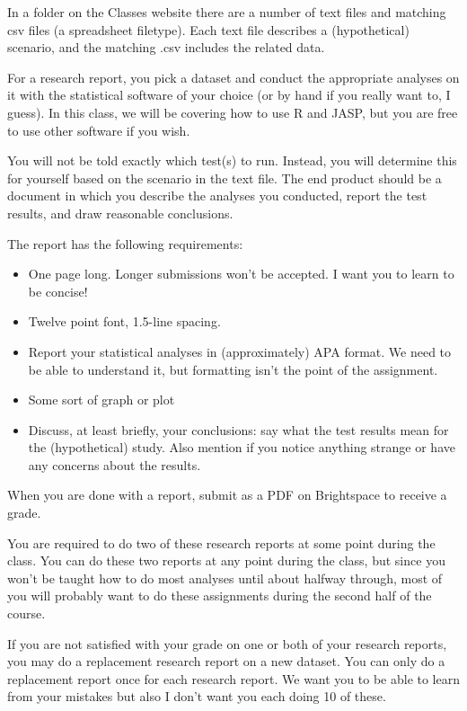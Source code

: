 \documentclass[
]{book}
\providecommand{\tightlist}{%
  \setlength{\itemsep}{0pt}\setlength{\parskip}{0pt}}
\begin{document}
In a folder on the Classes website there are a number of text files and matching csv files (a spreadsheet filetype). Each text file describes a (hypothetical) scenario, and the matching .csv includes the related data.

For a research report, you pick a dataset and conduct the appropriate analyses on it with the statistical software of your choice (or by hand if you really want to, I guess). In this class, we will be covering how to use R and JASP, but you are free to use other software if you wish.

You will not be told exactly which test(s) to run. Instead, you will determine this for yourself based on the scenario in the text file. The end product should be a document in which you describe the analyses you conducted, report the test results, and draw reasonable conclusions.

The report has the following requirements:

\begin{itemize}
\tightlist
\item
  One page long. Longer submissions won't be accepted. I want you to learn to be concise!
\item
  Twelve point font, 1.5-line spacing.
\item
  Report your statistical analyses in (approximately) APA format. We need to be able to understand it, but formatting isn't the point of the assignment.
\item
  Some sort of graph or plot
\item
  Discuss, at least briefly, your conclusions: say what the test results mean for the (hypothetical) study. Also mention if you notice anything strange or have any concerns about the results.
\end{itemize}

When you are done with a report, submit as a PDF on Brightspace to receive a grade.

You are required to do two of these research reports at some point during the class. You can do these two reports at any point during the class, but since you won't be taught how to do most analyses until about halfway through, most of you will probably want to do these assignments during the second half of the course.

If you are not satisfied with your grade on one or both of your research reports, you may do a replacement research report on a new dataset. You can only do a replacement report once for each research report. We want you to be able to learn from your mistakes but also I don't want you each doing 10 of these.
\end{document}
